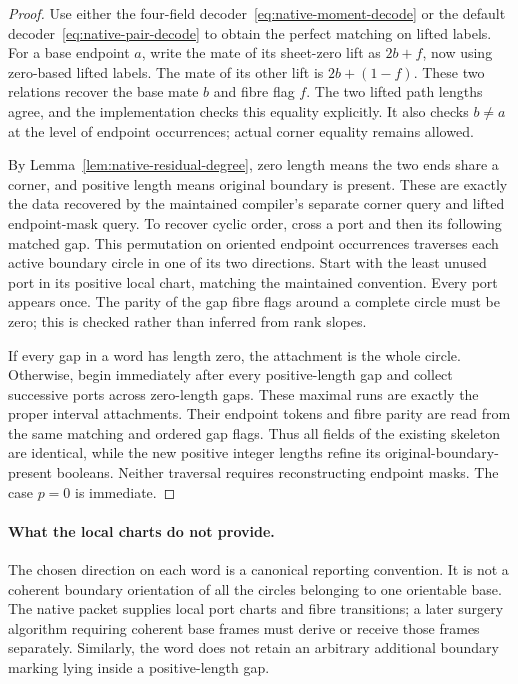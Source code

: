 \begin{proof}
Use either the four-field decoder~\eqref{eq:native-moment-decode} or
the default decoder~\eqref{eq:native-pair-decode} to obtain the perfect
matching on lifted labels.  For a base endpoint $a$, write the mate of its sheet-zero
lift as $2b+f$, now using zero-based lifted labels.  The mate of its other
lift is $2b+(1-f)$.  These two relations recover the base mate $b$ and fibre
flag $f$.  The two lifted path lengths agree, and the implementation checks
this equality explicitly.  It also checks $b\ne a$ at the level of
endpoint occurrences; actual corner equality remains allowed.

By Lemma~\ref{lem:native-residual-degree}, zero length means the two ends
share a corner, and positive length means original boundary is present.
These are exactly the data recovered by the maintained compiler's separate
corner query and lifted endpoint-mask query.  To recover cyclic order,
cross a port and then its following matched gap.  This permutation on
oriented endpoint occurrences traverses each active boundary circle in
one of its two directions.  Start with the least unused port in its
positive local chart, matching the maintained convention.  Every port
appears once.  The parity of the gap fibre flags around a complete circle
must be zero; this is checked rather than inferred from rank slopes.

If every gap in a word has length zero, the attachment is the whole circle.
Otherwise, begin immediately after every positive-length gap and collect
successive ports across zero-length gaps.  These maximal runs are exactly
the proper interval attachments.  Their endpoint tokens and fibre parity
are read from the same matching and ordered gap flags.  Thus all fields of
the existing skeleton are identical, while the new positive integer
lengths refine its original-boundary-present booleans.  Neither traversal
requires reconstructing endpoint masks.  The case $p=0$ is immediate.
\end{proof}

\paragraph{What the local charts do not provide.}
The chosen direction on each word is a canonical reporting convention.
It is not a coherent boundary orientation of all the circles belonging to
one orientable base.  The native packet supplies local port charts and
fibre transitions; a later surgery algorithm requiring coherent base
frames must derive or receive those frames separately.  Similarly, the
word does not retain an arbitrary additional boundary marking lying
inside a positive-length gap.

